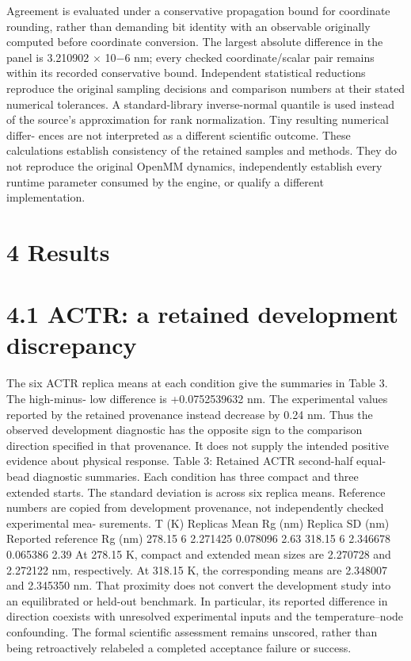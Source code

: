 \documentclass[11pt]{article}
\begin{document}
Agreement is evaluated under a conservative propagation bound for coordinate rounding, rather
than demanding bit identity with an observable originally computed before coordinate conversion.
The largest absolute difference in the panel is 3.210902 \ensuremath{\times} 10\ensuremath{-}6 nm; every checked coordinate/scalar
pair remains within its recorded conservative bound.
Independent statistical reductions reproduce the original sampling decisions and comparison
numbers at their stated numerical tolerances. A standard-library inverse-normal quantile is used
instead of the source’s approximation for rank normalization. Tiny resulting numerical differ-
ences are not interpreted as a different scientific outcome. These calculations establish consistency
of the retained samples and methods. They do not reproduce the original OpenMM dynamics,
independently establish every runtime parameter consumed by the engine, or qualify a different
implementation.

\section*{4 Results}


\section*{4.1 ACTR: a retained development discrepancy}

The six ACTR replica means at each condition give the summaries in Table 3. The high-minus-
low difference is +0.0752539632 nm. The experimental values reported by the retained provenance
instead decrease by 0.24 nm. Thus the observed development diagnostic has the opposite sign to
the comparison direction specified in that provenance. It does not supply the intended positive
evidence about physical response.
Table 3: Retained ACTR second-half equal-bead diagnostic summaries. Each condition has three
compact and three extended starts. The standard deviation is across six replica means. Reference
numbers are copied from development provenance, not independently checked experimental mea-
surements.
T (K) Replicas Mean Rg (nm) Replica SD (nm) Reported reference Rg (nm)
278.15 6 2.271425 0.078096 2.63
318.15 6 2.346678 0.065386 2.39
At 278.15 K, compact and extended mean sizes are 2.270728 and 2.272122 nm, respectively. At
318.15 K, the corresponding means are 2.348007 and 2.345350 nm. That proximity does not convert
the development study into an equilibrated or held-out benchmark. In particular, its reported
difference in direction coexists with unresolved experimental inputs and the temperature–node
confounding. The formal scientific assessment remains unscored, rather than being retroactively
relabeled a completed acceptance failure or success.
\end{document}

